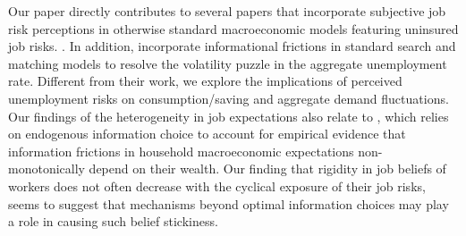 Our paper directly contributes to several papers that incorporate subjective job risk perceptions in otherwise standard macroeconomic models featuring uninsured job risks. \citep{pappa2023expectations, bardoczy2023unemployment}. In addition, \cite{morales2022cyclical, menzio2022stubborn, rodriguez2023role} incorporate informational frictions in standard search and matching models to resolve the volatility puzzle in the aggregate unemployment rate. Different from their work, we explore the implications of perceived unemployment risks on consumption/saving and aggregate demand fluctuations. Our findings of the heterogeneity in job expectations also relate to \cite{broer2021information}, which relies on endogenous information choice to account for empirical evidence that information frictions in household macroeconomic expectations non-monotonically depend on their wealth. Our finding that rigidity in job beliefs of workers does not often decrease with the cyclical exposure of their job risks, seems to suggest that mechanisms beyond optimal information choices may play a role in causing such belief stickiness. 


